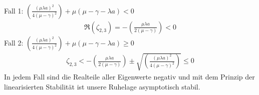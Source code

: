 \begin{solution}
\begin{align*}
\end{align*}
Fall 1: $\left(\frac{(\mu\lambda a)^2}{4(\mu - \gamma)^2}\right)
 + \mu(\mu - \gamma - \lambda a) < 0$
 \begin{align*}
   \Re(\zeta_{2,3}) = - \left(\frac{\mu\lambda a}{2(\mu - \gamma)}\right) < 0
 \end{align*}
 Fall 2: $\left(\frac{(\mu\lambda a)^2}{4(\mu - \gamma)^2}\right)
  + \mu(\mu - \gamma - \lambda a) \geq 0$
  \begin{align*}
    \zeta_{2,3} < - \left(\frac{\mu\lambda a}{2(\mu - \gamma)}\right)
    \pm \sqrt{\left(\frac{(\mu\lambda a)^2}{4(\mu - \gamma)^2}\right)} \leq 0
  \end{align*}
  In jedem Fall sind die Realteile aller Eigenwerte negativ und mit dem Prinzip
  der linearisierten Stabilität ist unsere Ruhelage asymptotisch stabil.
\end{solution}
